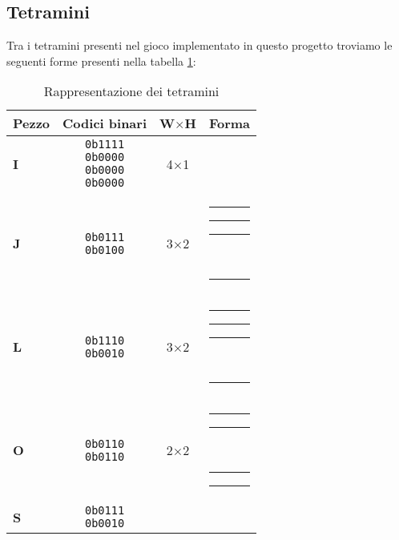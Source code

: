 \documentclass[a4paper, 12pt]{article}
\newcommand{\RedBlock}{\colorbox{red}{\rule{1.2ex}{1.2ex}}}      %
\newcommand{\WhiteBlock}{\fcolorbox{black}{white}{\rule{1.2ex}{1.2ex}}} %
\begin{document}
\subsection{Tetramini}
Tra i tetramini presenti nel gioco implementato in questo progetto troviamo le seguenti forme presenti nella tabella \ref{tab:tetramini}:
\begin{table}[H]
    \centering
    \caption{Rappresentazione dei tetramini}
    \label{tab:tetramini}
    \begin{tabular}{
            >{\bfseries}l   %
            c               %
            c               %
            l               %
        }
        \toprule
        Pezzo & Codici binari                                      & W\(\times\)H & Forma \\
        \midrule
        I     & \makecell{\texttt{0b1111}                                                 \\\texttt{0b0000}\\\texttt{0b0000}\\\texttt{0b0000}}
              & 4\(\times\)1
              & \makecell{\RedBlock\RedBlock\RedBlock\RedBlock}                           \\
        \addlinespace
        J     & \makecell{\texttt{0b0111}                                                 \\\texttt{0b0100}}
              & 3\(\times\)2
              & \makecell{\WhiteBlock\RedBlock\RedBlock\RedBlock                          \\\WhiteBlock\RedBlock\WhiteBlock\WhiteBlock} \\
        \addlinespace
        L     & \makecell{\texttt{0b1110}                                                 \\\texttt{0b0010}}
              & 3\(\times\)2
              & \makecell{\RedBlock\RedBlock\RedBlock\WhiteBlock                          \\\WhiteBlock\RedBlock\WhiteBlock\WhiteBlock} \\
        \addlinespace
        O     & \makecell{\texttt{0b0110}                                                 \\\texttt{0b0110}}
              & 2\(\times\)2
              & \makecell{\WhiteBlock\RedBlock\RedBlock\WhiteBlock                        \\\WhiteBlock\RedBlock\RedBlock\WhiteBlock} \\
        \addlinespace
        S     & \makecell{\texttt{0b0111}                                                 \\\texttt{0b0010}}

\end{tabular}
\end{table}
\end{document}
